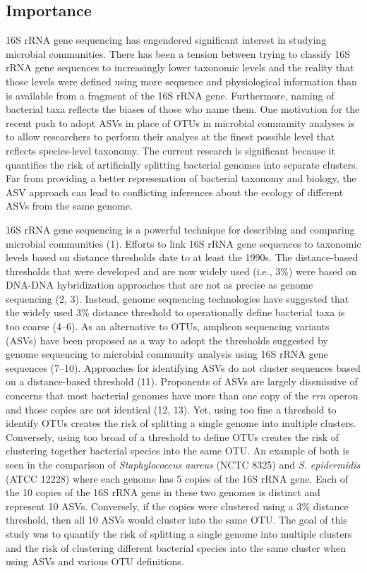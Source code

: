 \documentclass[
]{article}
\begin{document}
\hypertarget{importance}{%
\subsection{Importance}\label{importance}}

16S rRNA gene sequencing has engendered significant interest in studying
microbial communities. There has been a tension between trying to
classify 16S rRNA gene sequences to increasingly lower taxonomic levels
and the reality that those levels were defined using more sequence and
physiological information than is available from a fragment of the 16S
rRNA gene. Furthermore, naming of bacterial taxa reflects the biases of
those who name them. One motivation for the recent push to adopt ASVs in
place of OTUs in microbial community analyses is to allow researchers to
perform their analyes at the finest possible level that reflects
species-level taxonomy. The current research is significant because it
quantifies the risk of artificially splitting bacterial genomes into
separate clusters. Far from providing a better represenation of
bacterial taxonomy and biology, the ASV approach can lead to conflicting
inferences about the ecology of different ASVs from the same genome.

\newpage

16S rRNA gene sequencing is a powerful technique for describing and
comparing microbial communities (1). Efforts to link 16S rRNA gene
sequences to taxonomic levels based on distance thresholds date to at
least the 1990s. The distance-based thresholds that were developed and
are now widely used (i.e., 3\%) were based on DNA-DNA hybridization
approaches that are not as precise as genome sequencing (2, 3). Instead,
genome sequencing technologies have suggested that the widely used 3\%
distance threshold to operationally define bacterial taxa is too coarse
(4--6). As an alternative to OTUs, amplicon sequencing variants (ASVs)
have been proposed as a way to adopt the thresholds suggested by genome
sequencing to microbial community analysis using 16S rRNA gene sequences
(7--10). Approaches for identifying ASVs do not cluster sequences based
on a distance-based threshold (11). Proponents of ASVs are largely
dissmissive of concerns that most bacterial genomes have more than one
copy of the \emph{rrn} operon and those copies are not identical (12,
13). Yet, using too fine a threshold to identify OTUs creates the risk
of splitting a single genome into multiple clusters. Conversely, using
too broad of a threshold to define OTUs creates the risk of clustering
together bacterial species into the same OTU. An example of both is seen
in the comparison of \emph{Staphylococcus aureus} (NCTC 8325) and
\emph{S. epidermidis} (ATCC 12228) where each genome has 5 copies of the
16S rRNA gene. Each of the 10 copies of the 16S rRNA gene in these two
genomes is distinct and represent 10 ASVs. Conversely, if the copies
were clustered using a 3\% distance threshold, then all 10 ASVs would
cluster into the same OTU. The goal of this study was to quantify the
risk of splitting a single genome into multiple clusters and the risk of
clustering different bacterial species into the same cluster when using
ASVs and various OTU definitions.
\end{document}
